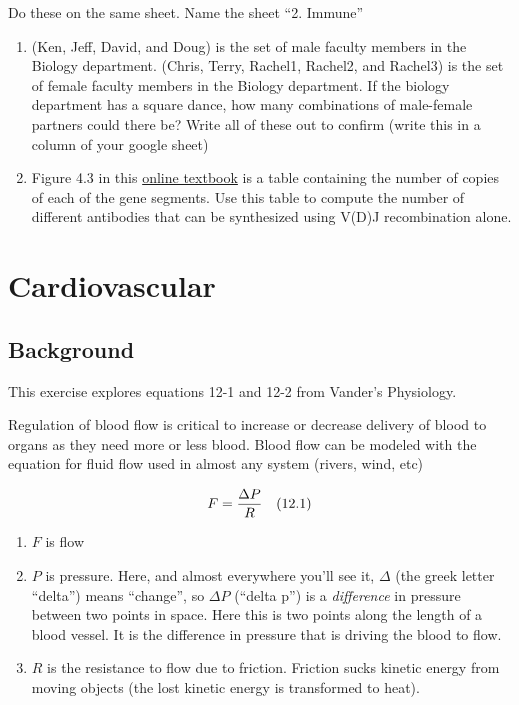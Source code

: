 \documentclass[]{book}
\providecommand{\tightlist}{%
  \setlength{\itemsep}{0pt}\setlength{\parskip}{0pt}}
\begin{document}
Do these on the same sheet. Name the sheet ``2. Immune''

\begin{enumerate}
\def\labelenumi{\arabic{enumi}.}
\item
  (Ken, Jeff, David, and Doug) is the set of male faculty members in the
  Biology department. (Chris, Terry, Rachel1, Rachel2, and Rachel3) is
  the set of female faculty members in the Biology department. If the
  biology department has a square dance, how many combinations of
  male-female partners could there be? Write all of these out to confirm
  (write this in a column of your google sheet)
\item
  Figure 4.3 in this
  \href{https://www.ncbi.nlm.nih.gov/books/NBK27140/}{online textbook}
  is a table containing the number of copies of each of the gene
  segments. Use this table to compute the number of different antibodies
  that can be synthesized using V(D)J recombination alone.
\end{enumerate}

\chapter{Cardiovascular}\label{cardiovascular}

\section{Background}\label{background}

This exercise explores equations 12-1 and 12-2 from Vander's Physiology.

Regulation of blood flow is critical to increase or decrease delivery of
blood to organs as they need more or less blood. Blood flow can be
modeled with the equation for fluid flow used in almost any system
(rivers, wind, etc)

\begin{equation}
F = \frac{\Delta P}{R} \quad \small{(12.1)}
\end{equation}

\begin{enumerate}
\def\labelenumi{\arabic{enumi}.}
\tightlist
\item
  \(F\) is flow
\item
  \(P\) is pressure. Here, and almost everywhere you'll see it,
  \(\Delta\) (the greek letter ``delta'') means ``change'', so
  \(\Delta P\) (``delta p'') is a \emph{difference} in pressure between
  two points in space. Here this is two points along the length of a
  blood vessel. It is the difference in pressure that is driving the
  blood to flow.
\item
  \(R\) is the resistance to flow due to friction. Friction sucks
  kinetic energy from moving objects (the lost kinetic energy is
  transformed to heat).
\end{enumerate}
\end{document}
